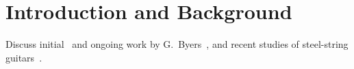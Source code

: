 %
%
%

 \section{Introduction and Background\label{sct:intro}}
Discuss initial~\cite{ref:byersweb} and ongoing work by G.\ Byers~\cite{ref:byers1996cgi}, and recent studies of steel-string guitars~\cite{ref:varieschi2010icf}.
